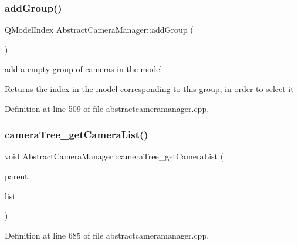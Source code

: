 \subsubsection{\texorpdfstring{addGroup()}{addGroup()}}
{\footnotesize\ttfamily Q\+Model\+Index Abstract\+Camera\+Manager\+::add\+Group (\begin{DoxyParamCaption}{ }\end{DoxyParamCaption})}



add a empty group of cameras in the model 

\begin{DoxyReturn}{Returns}
the index in the model corresponding to this group, in order to select it 
\end{DoxyReturn}


Definition at line 509 of file abstractcameramanager.\+cpp.

\mbox{\label{class_abstract_camera_manager_a81a5dd1be751723f195ac6269891ed3f}} 
\subsubsection{\texorpdfstring{cameraTree\_getCameraList()}{cameraTree\_getCameraList()}}
{\footnotesize\ttfamily void Abstract\+Camera\+Manager\+::camera\+Tree\+\_\+get\+Camera\+List (\begin{DoxyParamCaption}\item[{Q\+Standard\+Item $\ast$}]{parent,  }\item[{std\+::vector$<$ Q\+Standard\+Item $\ast$ $>$ $\ast$}]{list }\end{DoxyParamCaption})\hspace{0.3cm}{\ttfamily [protected]}}



Definition at line 685 of file abstractcameramanager.\+cpp.

\mbox{\label{class_abstract_camera_manager_a10dee0f2e9a5efa1cf8b5775df66fb19}} 
